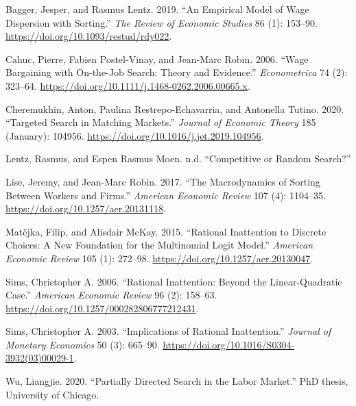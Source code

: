\documentclass[
  letterpaper,
  DIV=11,
  numbers=noendperiod]{scrartcl}
\newlength{\cslhangindent}
\newlength{\cslentryspacingunit} %
\newenvironment{CSLReferences}[2] %
 {%
  \setlength{\parindent}{0pt}
  \ifodd #1
  \let\oldpar\par
  \def\par{\hangindent=\cslhangindent\oldpar}
  \fi
  \setlength{\parskip}{#2\cslentryspacingunit}
 }%
 {}
\begin{document}
\hypertarget{refs}{}
\begin{CSLReferences}{1}{0}
\leavevmode{}%
Bagger, Jesper, and Rasmus Lentz. 2019. {``An {Empirical Model} of {Wage
Dispersion} with {Sorting}.''} \emph{The Review of Economic Studies} 86
(1): 153--90. \url{https://doi.org/10.1093/restud/rdy022}.

\leavevmode{}%
Cahuc, Pierre, Fabien Postel-Vinay, and Jean-Marc Robin. 2006. {``Wage
{Bargaining} with {On-the-Job Search}: {Theory} and {Evidence}.''}
\emph{Econometrica} 74 (2): 323--64.
\url{https://doi.org/10.1111/j.1468-0262.2006.00665.x}.

\leavevmode{}%
Cheremukhin, Anton, Paulina Restrepo-Echavarria, and Antonella Tutino.
2020. {``Targeted Search in Matching Markets.''} \emph{Journal of
Economic Theory} 185 (January): 104956.
\url{https://doi.org/10.1016/j.jet.2019.104956}.

\leavevmode{}%
Lentz, Rasmus, and Espen Rasmus Moen. n.d. {``Competitive or {Random
Search}?''}

\leavevmode{}%
Lise, Jeremy, and Jean-Marc Robin. 2017. {``The {Macrodynamics} of
{Sorting} Between {Workers} and {Firms}.''} \emph{American Economic
Review} 107 (4): 1104--35. \url{https://doi.org/10.1257/aer.20131118}.

\leavevmode{}%
Matějka, Filip, and Alisdair McKay. 2015. {``Rational {Inattention} to
{Discrete Choices}: {A New Foundation} for the {Multinomial Logit
Model}.''} \emph{American Economic Review} 105 (1): 272--98.
\url{https://doi.org/10.1257/aer.20130047}.

\leavevmode{}%
Sims, Christopher A. 2006. {``Rational {Inattention}: {Beyond} the
{Linear-Quadratic Case}.''} \emph{American Economic Review} 96 (2):
158--63. \url{https://doi.org/10.1257/000282806777212431}.

\leavevmode{}%
Sims, Christopher A. 2003. {``Implications of Rational Inattention.''}
\emph{Journal of Monetary Economics} 50 (3): 665--90.
\url{https://doi.org/10.1016/S0304-3932(03)00029-1}.

\leavevmode{}%
Wu, Liangjie. 2020. {``Partially {Directed Search} in the {Labor
Market}.''} PhD thesis, University of Chicago.

\end{CSLReferences}
\end{document}
